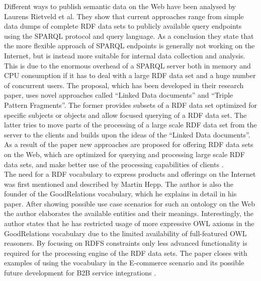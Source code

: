 Different ways to publish semantic data on the Web have been analysed by Laurens Rietveld et al. They show that current approaches range from simple data dumps of complete \gls{RDF} data sets to publicly available query endpoints using the \gls{SPARQL} protocol and query language. As a conclusion they state that the more flexible approach of \gls{SPARQL} endpoints is generally not working on the Internet, but is instead more suitable for internal data collection and analysis. This is due to the enormous overhead of a \gls{SPARQL} server both in memory and CPU consumption if it has to deal with a large \gls{RDF} data set and a huge number of concurrent users. The proposal, which has been developed in their research paper, uses novel approaches called ``Linked Data documents'' and ``Triple Pattern Fragments''. The former provides subsets of a \gls{RDF} data set optimized for specific subjects or objects and allow focused querying of a \gls{RDF} data set. The latter tries to move parts of the processing of a large scale \gls{RDF} data set from the server to the clients and builds upon the ideas of the ``Linked Data documents''. As a result of the paper new approaches are proposed for offering \gls{RDF} data sets on the Web, which are optimized for querying and processing large scale \gls{RDF} data sets, and make better use of the processing capabilities of clients \citep{rietveld2015linked}. \\

The need for a \gls{RDF} vocabulary to express products and offerings on the Internet was first mentioned and described by Martin Hepp. The author is also the founder of the GoodRelations vocabulary, which he explains in detail in his paper. After showing possible use case scenarios for such an ontology on the Web the author elaborates the available entities and their meanings. Interestingly, the author states that he has restricted usage of more expressive \gls{OWL} axioms in the GoodRelations vocabulary due to the limited availability of full-featured \gls{OWL} reasoners. By focusing on \gls{RDFS} constraints only less advanced functionality is required for the processing engine of the \gls{RDF} data sets. The paper closes with examples of using the vocabulary in the \gls{E-commerce} scenario and its possible future development for \gls{B2B} service integrations \citep{hepp2008goodrelations}. \\

